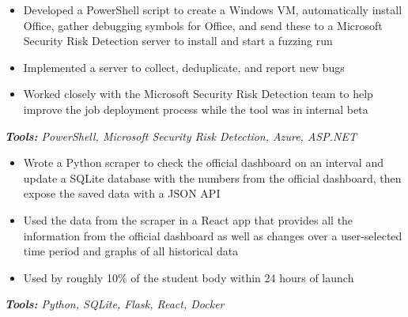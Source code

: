 \documentclass[10pt,letter]{altacv}
\begin{document}
\begin{itemize}
\item Developed a PowerShell script to create a Windows VM, automatically install Office, gather debugging symbols for Office, and send these to a Microsoft \\ Security Risk Detection server to install and start a fuzzing run
\item Implemented a server to collect, deduplicate, and report new bugs
\item Worked closely with the Microsoft Security Risk Detection team to help improve the job deployment process while the tool was in internal beta
\end{itemize}
\textit{\textbf{Tools:} PowerShell, Microsoft Security Risk Detection, Azure, ASP.NET}

\smallskip 




\begin{itemize}
\item Wrote a Python scraper to check the official dashboard on an interval and update a SQLite database with the numbers from the official dashboard, then expose the saved data with a JSON API
\item Used the data from the scraper in a React app that provides all the information from the official dashboard as well as changes over a user-selected time period and graphs of all historical data
\item Used by roughly 10\% of the student body within 24 hours of launch
\end{itemize}
\textit{\textbf{Tools:} Python, SQLite, Flask, React, Docker}
\end{document}
